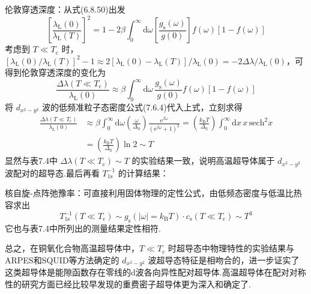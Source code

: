 伦敦穿透深度：从式(6.8.50)出发
\begin{equation*}
  \left[\frac{\lambda_{\mathrm{L}}(0)}{\lambda_{\mathrm{L}}(T)}\right]^{2}
  =1-2\beta\int_{0}^{\infty}\mathrm{d}\omega
  \left[\frac{g_{\mathrm{s}}(\omega)}{g(0)}\right]f(\omega)\left[1-f(\omega)\right]
\end{equation*}
考虑到 $T\ll T_{\mathrm{c}}$ 时，$\left[\lambda_{\mathrm{L}}(0)/\lambda_{\mathrm{L}}(T)\right]^{2}-1\approx2\left[\lambda_{\mathrm{L}}(0)-\lambda_{\mathrm{L}}(T)\right]/\lambda_{\mathrm{L}}(0)=-2\Delta\lambda/\lambda_{\mathrm{L}}(0)$，可得到伦敦穿透深度的变化为
\begin{equation}
  \frac{\Delta\lambda\left(T\ll T_{\mathrm{c}}\right)}{\lambda_{\mathrm{L}}(0)}
  \approx\beta\int_{0}^{\infty}\mathrm{d}\omega\,\frac{g_{\mathrm{s}}(\omega)}{g(0)}f(\omega)\left[1-f(\omega)\right]
\end{equation}
将 $d_{x^{2}-y^{2}}$ 波的低频准粒子态密度公式(7.6.4)代入上式，立刻求得
\begin{equation}
\begin{aligned}
  \frac{\Delta\lambda\left(T\ll T_{\mathrm{c}}\right)}{\lambda_{\mathrm{L}}(0)}
  &\approx\beta\int_{0}^{\infty}\mathrm{d}\omega\left(\frac{\omega}{\Delta_{0}}\right)
  \frac{\mathrm{e}^{\beta\omega}}{\left(\mathrm{e}^{\beta\omega}+1\right)^{2}}
  =\left(\frac{k_{\mathrm{B}}T}{\Delta_{0}}\right)\int_{0}^{\infty}\mathrm{d}x\,x\,\mathrm{sech}^{2}x\\
  &=\left(\frac{k_{\mathrm{B}}T}{\Delta_{0}}\right)\ln2\sim T
\end{aligned}
\end{equation}
显然与表7.4中 $\Delta\lambda\left(T\ll T_{\mathrm{c}}\right)\sim T$ 的实验结果一致，说明高温超导体属于 $d_{x^{2}-y^{2}}$ 波配对的超导态.最后再看 $T_{1\mathrm{s}}^{-1}$ 的计算结果：

核自旋-点阵弛豫率：可直接利用固体物理的定性公式，由低频态密度与低温比热容求出
\begin{equation}
  T_{1\mathrm{s}}^{-1}\left(T\ll T_{\mathrm{c}}\right)\sim g_{\mathrm{s}}\left(\left|\omega\right|=k_{\mathrm{B}}T\right)\cdot c_{\mathrm{s}}\left(T\ll T_{\mathrm{c}}\right)\sim T^{3}
\end{equation}
它也与表7.4中所列出的测量结果定性相符.

总之，在铜氧化合物高温超导体中，$T\ll T_{\mathrm{c}}$ 时超导态中物理特性的实验结果与ARPES和SQUID等方法确定的 $d_{x^{2}-y^{2}}$ 波超导态特征是相吻合的，进一步证实了这类超导体是能隙函数存在零线的d波各向异性配对超导体.高温超导体在配对对称性的研究方面已经比较早发现的重费密子超导体更为深入和确定了.

